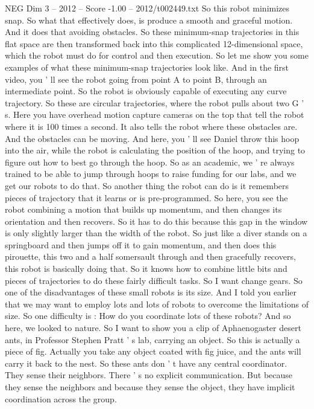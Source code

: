 \begin{textsample}{NEG Dim 3 – 2012 – Score -1.00 – 2012/t002449.txt}
So this robot minimizes snap.
So what that effectively does, is produce a smooth and graceful motion.
And it does that avoiding obstacles.
So these minimum-snap trajectories in this flat space are then transformed back into this complicated 12-dimensional space, which the robot must do for control and then execution.
So let me show you some examples of what these minimum-snap trajectories look like.
And in the first video, you ' ll see the robot going from point A to point B, through an intermediate point.
So the robot is obviously capable of executing any curve trajectory.
So these are circular trajectories, where the robot pulls about two G ' s.
Here you have overhead motion capture cameras on the top that tell the robot where it is 100 times a second.
It also tells the robot where these obstacles are.
And the obstacles can be moving.
And here, you ' ll see Daniel throw this hoop into the air, while the robot is calculating the position of the hoop, and trying to figure out how to best go through the hoop.
So as an academic, we ' re always trained to be able to jump through hoops to raise funding for our labs, and we get our robots to do that.
So another thing the robot can do is it remembers pieces of trajectory that it learns or is pre-programmed.
So here, you see the robot combining a motion that builds up momentum, and then changes its orientation and then recovers.
So it has to do this because this gap in the window is only slightly larger than the width of the robot.
So just like a diver stands on a springboard and then jumps off it to gain momentum, and then does this pirouette, this two and a half somersault through and then gracefully recovers, this robot is basically doing that.
So it knows how to combine little bits and pieces of trajectories to do these fairly difficult tasks.
So I want change gears.
So one of the disadvantages of these small robots is its size.
And I told you earlier that we may want to employ lots and lots of robots to overcome the limitations of size.
So one difficulty is : How do you coordinate lots of these robots?
And so here, we looked to nature.
So I want to show you a clip of Aphaenogaster desert ants, in Professor Stephen Pratt ' s lab, carrying an object.
So this is actually a piece of fig.
Actually you take any object coated with fig juice, and the ants will carry it back to the nest.
So these ants don ' t have any central coordinator.
They sense their neighbors.
There ' s no explicit communication.
But because they sense the neighbors and because they sense the object, they have implicit coordination across the group.

\end{textsample}
